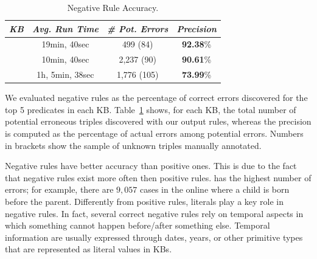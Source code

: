 \begin{table}[htb]
	\centering
	\caption{\krd Negative Rule Accuracy.}
	\label{tab:neg_rules_acc}
	\begin{small}
	\begin{tabular}{|c|c|c|c|}
		\hline
		\hline
		{\it KB}&{\it Avg. Run Time}&{\it \# Pot. Errors} & {\it Precision} \tabularnewline
		\hline
		\dbpedia & 19min, 40sec& 499 (84) & \textbf{92.38}\%\tabularnewline
		\yago 3 & 10min, 40sec & 2,237 (90) & \textbf{90.61}\%\tabularnewline
		\wikidata & 1h, 5min, 38sec & 1,776 (105)& \textbf{73.99}\%\tabularnewline
		\hline
	\end{tabular}
	\end{small}
\end{table}

We evaluated negative rules as the percentage of correct errors discovered for the top 5 predicates in each KB. Table~\ref{tab:neg_rules_acc} shows, for each KB, the total number of potential erroneous triples discovered with our output rules, whereas the precision is computed as the percentage of actual errors among potential errors. Numbers in brackets show the sample of unknown triples manually annotated.

Negative rules have better accuracy than positive ones. 
This is due to the fact that negative rules exist more often then positive rules.
 \yago has the highest number of errors; for example, there are $9,057$ cases in the online \yago where a child is born before the parent. 
%
Differently from positive rules, literals play a key role in negative rules. In fact, several correct negative rules rely on temporal aspects in which something cannot happen before/after something else. Temporal information are usually expressed through dates, years, or other primitive types that are represented as literal values in KBs.


